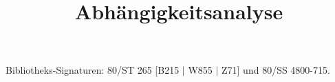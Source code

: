 \documentclass[a4paper,10pt]{scrartcl}
\title{Abhängigkeitsanalyse}
\begin{document}
\maketitle

\tableofcontents
\newpage

\nocite{Ban93}
\nocite{Ban94}
\nocite{Ban97}
\nocite{Fea91}
\nocite{Len93}
\nocite{Pugh95a}
\nocite{Wol89}
\nocite{Wol95}
\nocite{Zima90}



Bibliotheks-Signaturen: 80/ST 265 [B215 $|$ W855 $|$ Z71] und 80/SS 4800-715.





\end{document}
